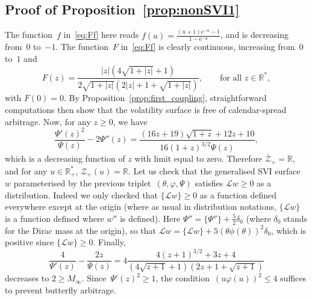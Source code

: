 \documentclass{amsart}[11pt]
\numberwithin{equation}{section}
\theoremstyle{definition}
\newcommand{\RR}{\mathbb{R}}
\newcommand{\Ll}{\mathcal{L}}
\newcommand{\E}{\mathrm{e}}
\newcommand{\Zz}{\mathcal{Z}}
\begin{document}
\subsection{Proof of Proposition~\ref{prop:nonSVI1}}\label{sec:prop:nonSVI1}
The function~$f$ in~\eqref{eq:Ff} here reads $f(u) = \frac{(u+1) \E^{-u} - 1}{1-\E^{-u}}$, 
and is decreasing from~$0$ to~$-1$.
The function~$F$ in~\eqref{eq:Ff} is clearly continuous, increasing from~$0$ to~$1$ and 
$$
F(z)=\frac{|z| (4 \sqrt{1+|z|} + 1)}{2\sqrt{1+|z|}(2 |z|+1+\sqrt{1+|z|})}, 
\qquad\text{for all }z\in\RR^*,
$$
with $F(0)=0$.
By Proposition~\ref{prop:first_coupling}, straightforward computations then show that the volatility surface is free of calendar-spread arbitrage.
Now, for any $z\geq 0$, we have
$$\frac{\Psi'(z)^2}{\Psi(z)}-2\Psi''(z) = \frac{(16 z+19)\sqrt{1+z} + 12 z + 10}{16 (1+z)^{3/2} \Psi(z)},$$
which is a decreasing function of $z$ with limit equal to zero.
Therefore $\overline{\Zz}_+=\RR $, and for any $u\in \RR_+^*$, $\Zz_+(u)=\RR$.
Let us check that the generalised SVI surface~$w$ parameterised by the previous triplet~$(\theta,\varphi,\Psi)$ satisfies $\Ll w \geq 0$ as a distribution. 
Indeed we only checked that $\{\Ll w\}\geq 0$ as a function defined everywhere except at the origin
(where as usual in distribution notations, $\{\Ll w\}$ is a function defined where $w''$ is defined).
Here  $\Psi''= \{\Psi''\} + \frac{5}{2} \delta_0$ (where $\delta_0$ stands for the Dirac mass at the origin), so that
$\Ll w= \{\Ll w\} + 5 (\theta \phi(\theta))^2 \delta_0$, 
which is positive since $\{\Ll w\} \geq 0$.
Finally, 
$$
\frac{4}{\Psi'(z)}-\frac{2 z}{\Psi(z)} = 4 \frac{4 (z+1)^{3/2} + 3 z + 4}
{\left(4\sqrt{z+1}+1\right)\left(2z+1+\sqrt{z+1}\right)}
$$ 
decreases to $2\geq M_\infty$.
Since~$\Psi'(z)^2\geq 1$, the condition~$(u \varphi(u))^2 \leq 4$ suffices to prevent butterfly arbitrage.




\end{document}
